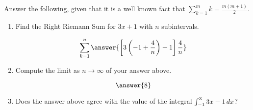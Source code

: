 \documentclass{ximera}
\author{Gregory Hartman \and Matthew Carr}
\begin{document}
\begin{exercise}


Answer the following, given that it is a well known fact that
$\sum_{k=1}^{m}k=\frac{m(m+1)}{2}$.
\begin{enumerate}
\item Find the Right Riemann Sum for $3x+1$ with $n$ subintervals.
\begin{prompt}
\[
\sum_{k=1}^n \answer{\left[3\left(-1+\frac{4}{n}\right)+1\right]\frac{4}{n}}
\]
\end{prompt}
\item Compute the limit as $n\to\infty$ of your answer above. \begin{prompt} \[\answer{8}\]
\end{prompt}
\item Does the answer above agree with the value of the integral
  $\int_{-1}^{3}3x-1\mathop{}\!d x$? \begin{multipleChoice}
   
\end{multipleChoice}
\end{enumerate}
\end{exercise}
\end{document}
